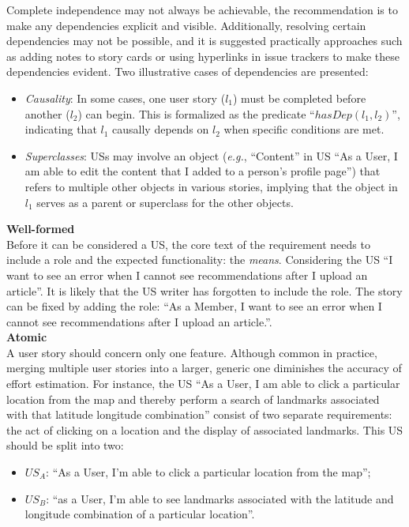 Complete independence may not always be achievable, the recommendation is to make any dependencies explicit and visible. Additionally, resolving certain dependencies may not be possible, and it is suggested practically approaches such as adding notes to story cards or using hyperlinks in issue trackers to make these dependencies evident. Two illustrative cases of dependencies are presented:
\begin{itemize}
\item 	\emph{Causality}: In some cases, one user story ($l_1$) must be completed before another ($l_2$) can begin. This is formalized as the predicate \enquote{$hasDep(l_1, l_2)$}, indicating that $ l_1$ causally depends on $l_2$ when specific conditions are met.
\item 	\emph{Superclasses}: USs may involve an object (\emph{e.g.}, \enquote{Content} in US \enquote{As a User, I am able to edit the content that I added to a person’s proﬁle page}) that refers to multiple other objects in various stories, implying that the object in $l_1$ serves as a parent or superclass for the other objects.
\end{itemize}
\textbf{Well-formed}\\ 
Before it can be considered a US, the core text of the requirement needs to include a role and the expected functionality: the \emph{means}. Considering the US \enquote{I want to see an error when I cannot see recommendations after I upload an article}. It is likely that the US writer has forgotten to include the role. The story can be ﬁxed by adding the role: \enquote{As a Member, I want to see an error when I cannot see recommendations after I upload an article.}.\\ 
\textbf{Atomic}\\ 
A user story should concern only one feature. Although common in practice, merging multiple user stories into a larger, generic one diminishes the accuracy of effort estimation\cite{liskin2014we}. For instance, the US \enquote{As a User, I am able to click a particular location from the map and thereby perform a search of landmarks associated with that latitude longitude combination} consist of two separate requirements: the act of clicking on a location and the display of associated landmarks. This US should be split into two:
\begin{itemize}
\item $US_A$: \enquote{As a User, I’m able to click a particular location from the map};
\item $US_B$: \enquote{as a User, I’m able to see landmarks associated with the latitude and longitude combination of a particular location}.
\end{itemize}
